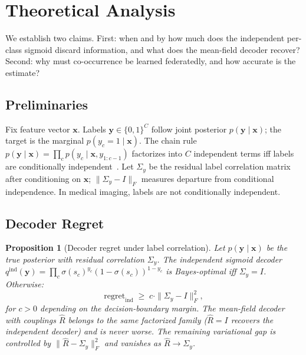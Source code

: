 \documentclass[conference]{IEEEtran}
\newtheorem{proposition}{Proposition}
\theoremstyle{definition}
\newcommand{\Rhat}{\widehat{R}}
\newcommand{\Sigmay}{\Sigma_{y}}
\begin{document}
\section{Theoretical Analysis}
\label{sec:theory}

We establish two claims. First: when and by how much does the independent per-class sigmoid discard information, and what does the mean-field decoder recover? Second: why must co-occurrence be learned federatedly, and how accurate is the estimate?

\subsection{Preliminaries}

Fix feature vector $\mathbf{x}$. Labels $\mathbf{y}{\in}\{0,1\}^{C}$ follow joint posterior $p(\mathbf{y}{\mid}\mathbf{x})$; the target is the marginal $p(y_c{=}1{\mid}\mathbf{x})$. The chain rule $p(\mathbf{y}{\mid}\mathbf{x}){=}\prod_c p(y_c{\mid}\mathbf{x},y_{1:c-1})$ factorizes into $C$ independent terms iff labels are conditionally independent~\cite{dembczynski2012labeldependence}. Let $\Sigmay$ be the residual label correlation matrix after conditioning on $\mathbf{x}$; $\|\Sigmay-I\|_F$ measures departure from conditional independence. In medical imaging, labels are not conditionally independent.

\subsection{Decoder Regret}

\begin{proposition}[Decoder regret under label correlation]
\label{prop:regret}
Let $p(\mathbf{y}{\mid}\mathbf{x})$ be the true posterior with residual correlation $\Sigmay$. The independent sigmoid decoder $q^{\mathrm{ind}}(\mathbf{y}){=}\prod_c\sigma(s_c)^{y_c}(1{-}\sigma(s_c))^{1-y_c}$ is Bayes-optimal iff $\Sigmay{=}I$. Otherwise:
\begin{equation}
\mathrm{regret}_{\mathrm{ind}}\;\geq\;c\cdot\|\Sigmay-I\|_F^{2},
\end{equation}
for $c{>}0$ depending on the decision-boundary margin. The mean-field decoder with couplings $\Rhat$ belongs to the same factorized family ($\Rhat{=}I$ recovers the independent decoder) and is never worse. The remaining variational gap is controlled by $\|\Rhat-\Sigmay\|_F^{2}$ and vanishes as $\Rhat\to\Sigmay$.
\end{proposition}
\end{document}
